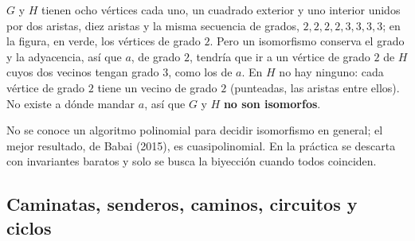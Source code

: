 \documentclass[11pt,letterpaper]{article}
\begin{document}
\begin{ejemplo}
  \label{ej:isomorfismo-teoria}
  $G$ y $H$ tienen ocho vértices cada uno, un cuadrado exterior y uno
  interior unidos por dos aristas, diez aristas y la misma secuencia
  de grados, $2, 2, 2, 2, 3, 3, 3, 3$; en la figura, en verde, los
  vértices de grado $2$. Pero un isomorfismo conserva el grado y la
  adyacencia, así que $a$, de grado $2$, tendría que ir a un vértice de
  grado $2$ de $H$ cuyos dos vecinos tengan grado $3$, como los de $a$.
  En $H$ no hay ninguno: cada vértice de grado $2$ tiene un vecino de
  grado $2$ (punteadas, las aristas entre ellos). No existe a dónde
  mandar $a$, así que $G$ y $H$ \textbf{no son isomorfos}.
  \begin{center}
  \end{center}
\end{ejemplo}

No se conoce un algoritmo polinomial para decidir isomorfismo en
general; el mejor resultado, de Babai (2015), es cuasipolinomial. En
la práctica se descarta con invariantes baratos y solo se busca la
biyección cuando todos coinciden.


\subsection*{Caminatas, senderos, caminos, circuitos y ciclos}
\end{document}
